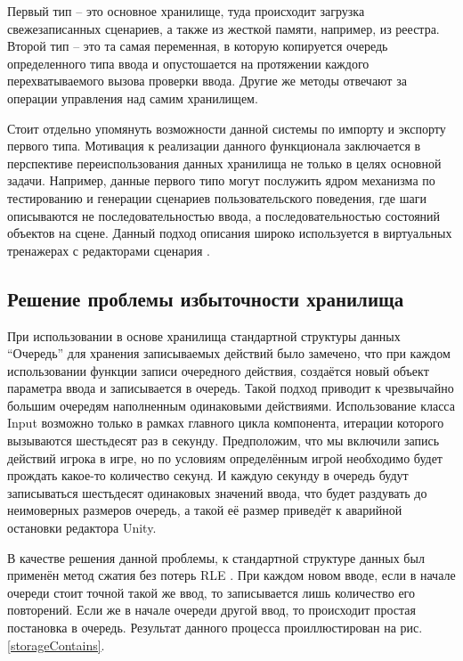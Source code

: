 Первый тип -- это основное хранилище, туда происходит загрузка свежезаписанных сценариев, а также из жесткой памяти, например, из реестра. Второй тип -- это та самая переменная, в которую копируется очередь определенного типа ввода и опустошается на протяжении каждого перехватываемого вызова проверки ввода. Другие же методы отвечают за операции управления над самим хранилищем.

Стоит отдельно упомянуть возможности данной системы по импорту и экспорту первого типа. Мотивация к реализации данного функционала заключается в перспективе переиспользования данных хранилища не только в целях основной задачи. Например, данные первого типо могут послужить ядром механизма по тестированию и генерации сценариев пользовательского поведения, где шаги описываются не последовательностью ввода, а последовательностью состояний объектов на сцене. Данный подход описания широко используется в виртуальных тренажерах с редакторами сценария \cite{virtual_trainers}.

\subsection{Решение проблемы избыточности хранилища}
При использовании в основе хранилища стандартной структуры данных ``Очередь'' для хранения записываемых действий было замечено, что при каждом использовании функции записи очередного действия, создаётся новый объект параметра ввода и записывается в очередь. Такой подход приводит к чрезвычайно большим очередям наполненным одинаковыми действиями. Использование класса Input возможно только в рамках главного цикла компонента, итерации которого вызываются шестьдесят раз в секунду. Предположим, что мы включили запись действий игрока в игре, но по условиям определённым игрой необходимо будет прождать какое-то количество секунд. И каждую секунду в очередь будут записываться шестьдесят одинаковых значений ввода, что будет раздувать до неимоверных размеров очередь, а такой её размер приведёт к аварийной остановки редактора Unity.

В качестве решения данной проблемы, к стандартной структуре данных был применён метод сжатия без потерь RLE \cite{rle}. При каждом новом вводе, если в начале очереди стоит точной такой же ввод, то записывается лишь количество его повторений. Если же в начале очереди другой ввод, то происходит простая постановка в очередь. Результат данного процесса проиллюстирован на рис. \ref{storageContains}.

